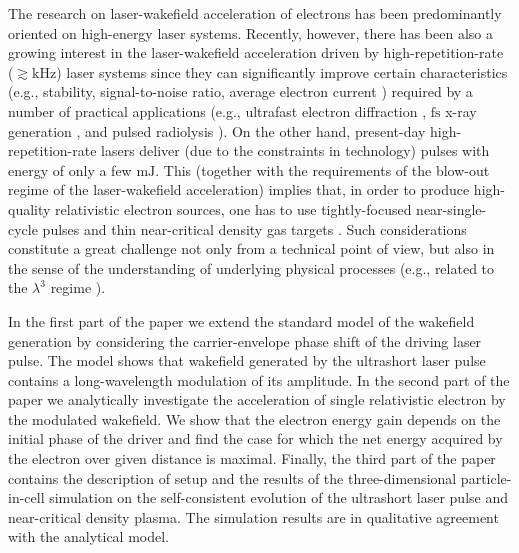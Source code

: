 \documentclass[10pt, a4paper, twoside, openright]{report}
\begin{document}
The research on laser-wakefield acceleration of electrons has been predominantly oriented on high-energy laser systems. Recently, however, there has been also a growing interest in the laser-wakefield acceleration driven by high-repetition-rate ($ \gtrsim \mathrm{kHz} $) laser systems since they can significantly improve certain characteristics (e.g., stability, signal-to-noise ratio, average electron current \cite{Faure2018}) required by a number of practical applications (e.g., ultrafast electron diffraction \cite{Sciaini2011, Miller2014}, $ \mathrm{fs} $ x-ray generation \cite{TaPhuoc2012, Corde2013}, and pulsed radiolysis \cite{Muroya2008}). On the other hand, present-day high-repetition-rate lasers deliver (due to the constraints in technology) pulses with energy of only a few $ \mathrm{mJ} $. This (together with the requirements of the blow-out regime of the laser-wakefield acceleration) implies that, in order to produce high-quality relativistic electron sources, one has to use tightly-focused near-single-cycle pulses and thin near-critical density gas targets \cite{Faure2018, Salehi2019}. Such considerations constitute a great challenge not only from a technical point of view, but also in the sense of the understanding of underlying physical processes (e.g., related to the $ \lambda^{3} $ regime \cite{Mourou2002, Naumova2004}).

In the first part of the paper we extend the standard model of the wakefield generation by considering the carrier-envelope phase shift of the driving laser pulse. The model shows that wakefield generated by the ultrashort laser pulse contains a long-wavelength modulation of its amplitude. In the second part of the paper we analytically investigate the acceleration of single relativistic electron by the modulated wakefield. We show that the electron energy gain depends on the initial phase of the driver and find the case for which the net energy acquired by the electron over given distance is maximal. Finally, the third part of the paper contains the description of setup and the results of the three-dimensional particle-in-cell simulation on the self-consistent evolution of the ultrashort laser pulse and near-critical density plasma. The simulation results are in qualitative agreement with the analytical model.
\end{document}
